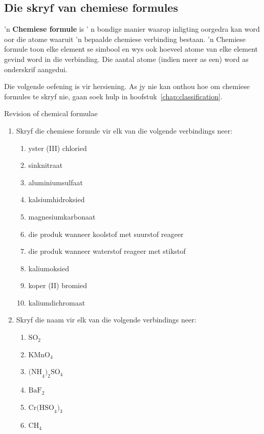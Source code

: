 \subsection*{Die skryf van chemiese formules}
\nopagebreak
\label{m38721*id62835}'n \textbf{Chemiese formule} is ' n bondige manier waarop inligting oorgedra kan word oor die atome waaruit 'n bepaalde chemiese verbinding bestaan. 'n Chemiese formule toon elke element se simbool en wys ook hoeveel atome van elke element gevind word in die verbinding. Die aantal atome (indien meer as een) word as onderskrif aangedui.\par 
Die volgende oefening is vir hersiening. As jy nie kan onthou hoe om chemiese formules te skryf nie, gaan soek hulp in hoofstuk~\ref{chap:classification}.

\begin{exercises}{Revision of chemical formulae}
{
\begin{enumerate}[noitemsep, label=\textbf{\arabic*}.]
  \item Skryf die chemiese formule vir elk van die volgende verbindings neer:
\begin{enumerate}[noitemsep, label=\textbf{\alph*}. ]
 \item yster (III) chloried
\item sinknitraat
\item aluminiumsulfaat
\item kalsiumhidroksied
\item magnesiumkarbonaat
\item die produk wanneer koolstof met suurstof reageer
\item die produk wanneer waterstof reageer met stikstof
\item kaliumoksied
\item koper (II) bromied
\item kaliumdichromaat
\end{enumerate}
\item Skryf die naam vir elk van die volgende verbindings neer:
\begin{enumerate}[noitemsep, label=\textbf{\alph*}. ]
 \item $\text{SO}_2$
\item $\text{KMnO}_4$
\item $\text{(NH}_{4}\text{)}_{2}\text{SO}_{4}$
\item $\text{BaF}_2$
\item $\text{Cr(HSO}_{4}\text{)}_{3}$
\item $\text{CH}_{4}$
\end{enumerate}
\end{enumerate}

}
\end{exercises}

